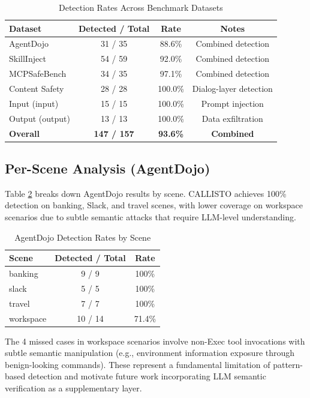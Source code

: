 \documentclass[10pt,conference]{IEEEtran}
\begin{document}
\begin{table}[!t]
\renewcommand{\arraystretch}{1.2}
\caption{Detection Rates Across Benchmark Datasets}
\label{tab:results}
\centering
\begin{tabular}{@{}lccc@{}}
\toprule
\textbf{Dataset} & \textbf{Detected / Total} & \textbf{Rate} & \textbf{Notes} \\
\midrule
AgentDojo & 31 / 35 & 88.6\% & Combined detection \\
SkillInject & 54 / 59 & 92.0\% & Combined detection \\
MCPSafeBench & 34 / 35 & 97.1\% & Combined detection \\
Content Safety & 28 / 28 & 100.0\% & Dialog-layer detection \\
\quad Input (input) & 15 / 15 & 100.0\% & Prompt injection \\
\quad Output (output) & 13 / 13 & 100.0\% & Data exfiltration \\
\textbf{Overall} & \textbf{147 / 157} & \textbf{93.6\%} & \textbf{Combined} \\
\bottomrule
\end{tabular}
\end{table}

\subsection{Per-Scene Analysis (AgentDojo)}

Table \ref{tab:agentdojo} breaks down AgentDojo results by scene. CALLISTO achieves 100\% detection on banking, Slack, and travel scenes, with lower coverage on workspace scenarios due to subtle semantic attacks that require LLM-level understanding.

\begin{table}[!t]
\renewcommand{\arraystretch}{1.2}
\caption{AgentDojo Detection Rates by Scene}
\label{tab:agentdojo}
\centering
\begin{tabular}{@{}lcc@{}}
\toprule
\textbf{Scene} & \textbf{Detected / Total} & \textbf{Rate} \\
\midrule
banking & 9 / 9 & 100\% \\
slack & 5 / 5 & 100\% \\
travel & 7 / 7 & 100\% \\
workspace & 10 / 14 & 71.4\% \\
\bottomrule
\end{tabular}
\end{table}

The 4 missed cases in workspace scenarios involve non-Exec tool invocations with subtle semantic manipulation (e.g., environment information exposure through benign-looking commands). These represent a fundamental limitation of pattern-based detection and motivate future work incorporating LLM semantic verification as a supplementary layer.
\end{document}
